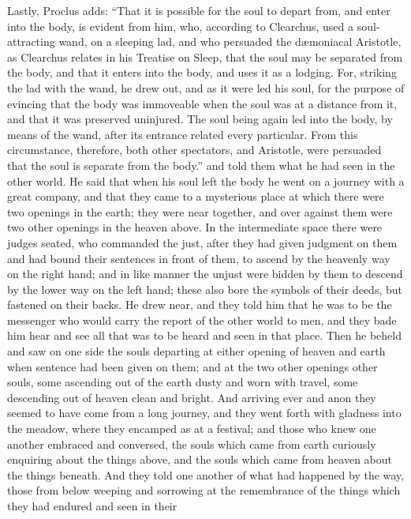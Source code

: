 \documentclass[12pt]{article}
\begin{document}
{Lastly, Proclus adds: ``That it is possible for the soul to depart from, and
enter into the body, is evident from him, who, according to Clearchus, used a
soul-attracting wand, on a sleeping lad, and who persuaded the d{\ae}moniacal
Aristotle, as Clearchus relates in his Treatise on Sleep, that the soul may be
separated from the body, and that it enters into the body, and uses it as a
lodging. For, striking the lad with the wand, he drew out, and as it were led
his soul, for the purpose of evincing that the body was immoveable when the
soul was at a distance from it, and that it was preserved uninjured. The soul
being again led into the body, by means of the wand, after its entrance related
every particular. From this circumstance, therefore, both other spectators, and
Aristotle, were persuaded that the soul is separate from the body.''} and told
them what he had seen in the other world. He said that when his soul left the
body he went on a journey with a great company, and that they
came to a mysterious place at which there were two openings in the earth; they
were near together, and over against them were two other openings in the heaven
above. In the intermediate space there were judges seated, who commanded the
just, after they had given judgment on them and had bound their sentences in
front of them, to ascend by the heavenly way on the right hand; and in like
manner the unjust were bidden by them to descend by the lower way on the left
hand; these also bore the symbols of their deeds, but fastened on their backs.
He drew near, and they told him that he was to be the messenger who would carry
the report of the other world to men, and they bade him hear and see all that
was to be heard and seen in that place. Then he beheld and saw on one side the
souls departing at either opening of heaven and earth when sentence had been
given on them; and at the two other openings other souls, some ascending out of
the earth dusty and worn with travel, some descending out of heaven clean and
bright. And arriving ever and anon they seemed to have come from a long
journey, and they went forth with gladness into the meadow, where they encamped
as at a festival; and those who knew one another embraced and conversed, the
souls which came from earth curiously enquiring about the things above, and the
souls which came from heaven about the things beneath. And they told one
another of what had happened by the way, those from below weeping and sorrowing
at the remembrance of the things which they had endured and seen in their
\end{document}
